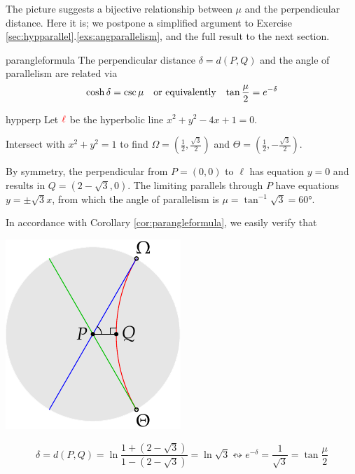 The picture suggests a bijective relationship between $\mu$ and the perpendicular distance. Here it is; we postpone a simplified argument to Exercise \ref*{sec:hypparallel}.\ref{exs:angparallelism}, and the full result to the next section.%

\begin{cor}{}{parangleformula}
	The perpendicular distance $\delta=d(P,Q)$ and the angle of parallelism are related via
	\[
		\cosh\delta=\csc\mu\quad\text{or equivalently}\quad \smash[t]{\tan\frac{\mu}2}=e^{-\delta}
	\]
\end{cor}


\begin{examples}{}{hypperp}
	\exstart Let $\textcolor{red}{\ell}$ be the hyperbolic line $x^2+y^2-4x+1=0$.
	\begin{enumerate}\setcounter{enumi}{1}
		\begin{minipage}[t]{0.7\linewidth}\vspace{-5pt}
		  \item[]Intersect with $x^2+y^2=1$ to find $\Omega=\left(\tfrac 12,\tfrac{\sqrt 3}2\right)$ and $\Theta=\left(\tfrac 12,-\tfrac{\sqrt 3}2\right)$.\par
			By symmetry, the perpendicular from $P=(0,0)$ to $\ell$ has equation $y=0$ and results in $Q=(2-\sqrt 3,0)$.\smallbreak
			The limiting parallels through $P$ have equations $y=\pm\sqrt 3x$, from which the angle of parallelism is $\mu=\tan^{-1}\sqrt 3=\ang{60}$.\par
		  In accordance with Corollary \ref{cor:parangleformula}, we easily verify that
		\end{minipage}
		\hfill
		\begin{minipage}[t]{0.29\linewidth}\vspace{-25pt}
		  \flushright\includegraphics[scale=0.95]{basic-parallels4}
		\end{minipage}\par\vspace{-15pt}
		\[
			\delta=d(P,Q)=\ln\frac{1+(2-\sqrt 3)}{1-(2-\sqrt 3)}=\ln\sqrt 3 \leftrightsquigarrow e^{-\delta}=\frac 1{\sqrt 3}=\tan\frac{\mu}2
		\]
	  

\end{enumerate}
\end{examples}

